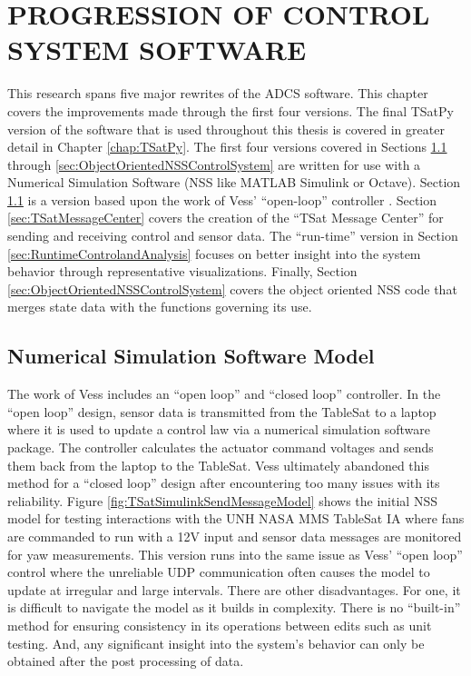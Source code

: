 
\chapter{PROGRESSION OF CONTROL SYSTEM SOFTWARE}
\label{chap:ProgressionOfControlSystemSoftware}

This research spans five major rewrites of the ADCS software.  This chapter covers the improvements made through the first four versions.  The final TSatPy version of the software that is used throughout this thesis is covered in greater detail in Chapter \ref{chap:TSatPy}.  The first four versions covered in Sections \ref{sec:NSSModel} through \ref{sec:ObjectOrientedNSSControlSystem} are written for use with a Numerical Simulation Software (NSS like MATLAB Simulink or Octave).  Section \ref{sec:NSSModel} is a version based upon the work of Vess' ``open-loop'' controller \cite{vessthesis}.  Section \ref{sec:TSatMessageCenter} covers the creation of the ``TSat Message Center'' for sending and receiving control and sensor data.  The ``run-time'' version in Section \ref{sec:RuntimeControlandAnalysis} focuses on better insight into the system behavior through representative visualizations.  Finally, Section \ref{sec:ObjectOrientedNSSControlSystem} covers the object oriented NSS code that merges state data with the functions governing its use.

\section{Numerical Simulation Software Model}
\label{sec:NSSModel}

The work of Vess \cite{vessthesis} includes an ``open loop'' and ``closed loop'' controller.  In the ``open loop'' design, sensor data is transmitted from the TableSat to a laptop where it is used to update a control law via a numerical simulation software package.  The controller calculates the actuator command voltages and sends them back from the laptop to the TableSat.  Vess ultimately abandoned this method for a ``closed loop'' design after encountering too many issues with its reliability.  Figure \ref{fig:TSatSimulinkSendMessageModel} shows the initial NSS model for testing interactions with the UNH NASA MMS TableSat IA where fans are commanded to run with a  12V input and sensor data messages are monitored for yaw measurements.  This version runs into the same issue as Vess' ``open loop'' control where the unreliable UDP communication often causes the model to update at irregular and large intervals.  There are other disadvantages.  For one, it is difficult to navigate the model as it builds in complexity.  There is no ``built-in'' method for ensuring consistency in its operations between edits such as unit testing.  And, any significant insight into the system's behavior can only be obtained after the post processing of data.

